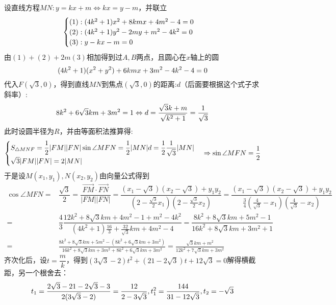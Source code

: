 \begin{solution}
    设直线方程$MN:y=kx+m\Leftrightarrow kx=y-m$，并联立
    \vspace{-10pt}
    \[\begin{cases}(1):(4k^2+1)x^2+8kmx+4m^2-4=0\\(2):(4k^2+1)y^2-2my+m^2-4k^2=0\\(3):y-kx-m=0\end{cases}\vspace{-10pt}\]
    由$(1)+(2)+2m(3)$相加得到过$A,B$两点，且圆心在$x$轴上的圆\vspace{-10pt}
    \[(4k^2+1)(x^2+y^2)+6kmx+3m^2-4k^2-4=0\vspace{-10pt}\]
    代入$F(\sqrt3,0)$，得到直线$MN$到焦点$(\sqrt3,0)$的距离:$d$（后面要根据这个式子求斜率）:\vspace{-10pt}
    \[8k^2+6\sqrt{3}km+3m^2=1\Leftrightarrow d=\dfrac{\sqrt{3}k+m}{\sqrt{k^2+1}}=\dfrac{1}{\sqrt3}\vspace{-10pt}\]
    此时设圆半径为$R$，并由等面积法推算得:\vspace{-10pt}\[\begin{cases}S_{\triangle{MNF}}=\dfrac12|FM||FN|\sin\angle{MFN}=\dfrac12|MN|d=\dfrac{1}{2}\dfrac{1}{\sqrt3}|MN|\\\sqrt{3}|FM||FN|=2|MN|\end{cases}\Rightarrow \sin\angle{MFN}=\dfrac12\vspace{-10pt}\]
    于是设$M(x_1,y_1),N(x_2,y_2)$由向量公式得到
    \begin{align*}
        \cos\angle{MFN}=&\dfrac{\sqrt3}{2}=\dfrac{\overrightarrow{FM}\cdot\overrightarrow{FN}}{|FM||FN|}=\dfrac{(x_1-\sqrt3)(x_2-\sqrt3)+y_1y_2}{(2-\frac{\sqrt3}{2}x_1)(2-\frac{\sqrt3}{2}x_2)}=\dfrac{(x_1-\sqrt3)(x_2-\sqrt3)+y_1y_2}{\frac34(\frac{4}{\sqrt3}-x_1)(\frac{4}{\sqrt3}-x_2)}\\
        =&\dfrac{4}{3}\dfrac{12k^2+8\sqrt{3}km+4m^2-1+m^2-4k^2}{(4k^2+1)\frac{16}{3}+\frac{32}{\sqrt3}km+4m^2-4}=\dfrac{8k^2+8\sqrt{3}km+5m^2-1}{16k^2+8\sqrt{3}km+3m^2+1}\\
        =&\frac{8k^2+8\sqrt{3}km+5m^2-(8k^2+6\sqrt{3}km+3m^2)}{16k^2+8\sqrt{3}km+3m^2+8k^2+6\sqrt{3}km+3m^2}=\frac{\sqrt3km+m^2}{12k^2+7\sqrt3km+3m^2}
    \end{align*}
    齐次化后，设$t=\dfrac{m}{k}$，得到$(3\sqrt3-2)t^2+(21-2\sqrt3)t+12\sqrt3=0$解得横截距，另一个根舍去：\vspace{-10pt}
    \[t_1=\dfrac{2\sqrt3-21-2\sqrt3-3}{2(3\sqrt3-2)}=\dfrac{12}{2-3\sqrt3},t_1^2=\dfrac{144}{31-12\sqrt3},t_2=-\sqrt3\vspace{-5pt}\]

\end{solution}
